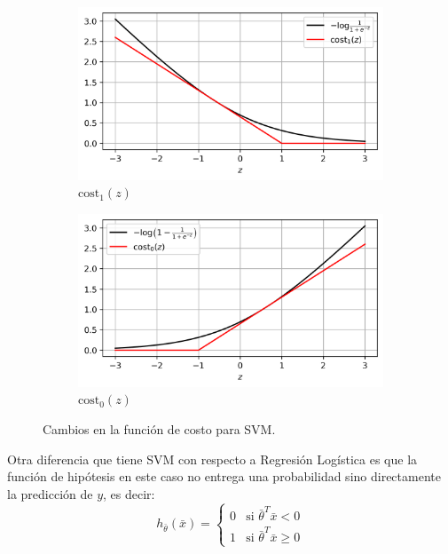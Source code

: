 \begin{figure}[ht!]
  \centering
  \begin{subfigure}[b]{0.49\textwidth}
    \centering
    \includegraphics[width=\linewidth]{images/05-Machine Learning/ml_cost1.png}
    \caption{$\mathrm{cost}_1(z)$}
  \end{subfigure}
  \hfill
  \begin{subfigure}[b]{0.49\textwidth}
    \centering
    \includegraphics[width=\linewidth]{images/05-Machine Learning/ml_cost0.png}
    \caption{$\mathrm{cost}_0(z)$}
  \end{subfigure}
  \caption{Cambios en la función de costo para SVM.}
  \label{fig:ml_cost_svm}
\end{figure}

Otra diferencia que tiene SVM con respecto a Regresión Logística es que la función de hipótesis en este caso no entrega una probabilidad sino directamente la predicción de $y$, es decir:
\begin{equation}
  h_{\bar{\theta}}(\bar{x})=\left\{\begin{matrix}
    0 & \textrm{si }\bar{\theta}^T \bar{x} < 0    \\
    1 & \textrm{si }\bar{\theta}^T \bar{x} \geq 0
  \end{matrix}\right.
  \label{eq:ml_hip_svm}
\end{equation}


